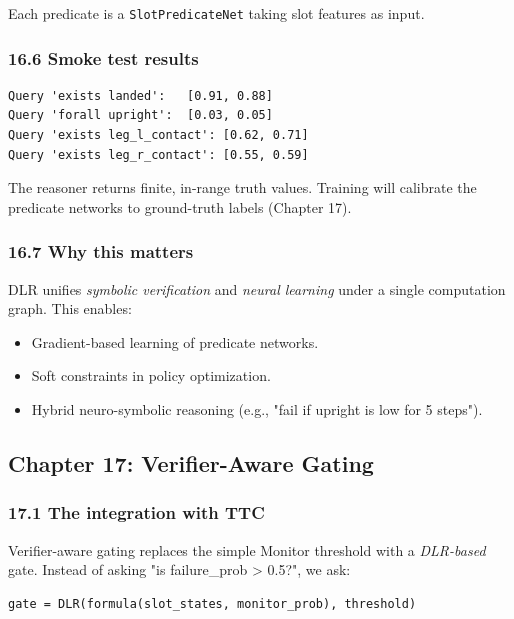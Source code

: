 \documentclass[11pt]{article}
\begin{document}
Each predicate is a \texttt{SlotPredicateNet} taking slot features as input.

\subsubsection{16.6 Smoke test results}

\begin{verbatim}
Query 'exists landed':   [0.91, 0.88]
Query 'forall upright':  [0.03, 0.05]
Query 'exists leg_l_contact': [0.62, 0.71]
Query 'exists leg_r_contact': [0.55, 0.59]
\end{verbatim}

The reasoner returns finite, in-range truth values. Training will calibrate the
predicate networks to ground-truth labels (Chapter 17).

\subsubsection{16.7 Why this matters}

DLR unifies \textit{symbolic verification} and \textit{neural learning} under a single
computation graph. This enables:

\begin{itemize}
  \item Gradient-based learning of predicate networks.
  \item Soft constraints in policy optimization.
  \item Hybrid neuro-symbolic reasoning (e.g., "fail if upright is low for 5 steps").
\end{itemize}


\hrulefill

\subsection{Chapter 17: Verifier-Aware Gating}

\subsubsection{17.1 The integration with TTC}

Verifier-aware gating replaces the simple Monitor threshold with a \textit{DLR-based}
gate. Instead of asking "is failure\_prob > 0.5?", we ask:

\begin{verbatim}
gate = DLR(formula(slot_states, monitor_prob), threshold)
\end{verbatim}
\end{document}
